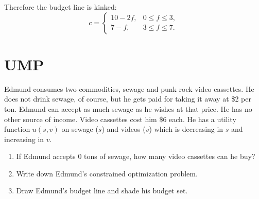 \documentclass[12pt,a4paper]{article}
\begin{document}
\begin{enumerate}
  Therefore the budget line is kinked:
  \[
    c=
    \begin{cases}
      10-2f, & 0\le f\le 3,\\[4pt]
      7-f, & 3\le f\le 7.
    \end{cases}
  \]
  \begin{center}
  \end{center}
\end{enumerate}

\section{UMP}
Edmund consumes two commodities, sewage and punk rock video cassettes. He does not drink sewage, of course, but he gets paid for taking it away at \$2 per ton. Edmund can accept as much sewage as he wishes at that price. He has no other source of income. Video cassettes cost him \$6 each. He has a utility function $u(s,v)$ on sewage ($s$) and videos ($v$) which is decreasing in $s$ and increasing in $v$.

\begin{enumerate}
  \item If Edmund accepts 0 tons of sewage, how many video cassettes can he buy?
  \item Write down Edmund's constrained optimization problem.
  \item Draw Edmund's budget line and shade his budget set.
\end{enumerate}
\end{document}
